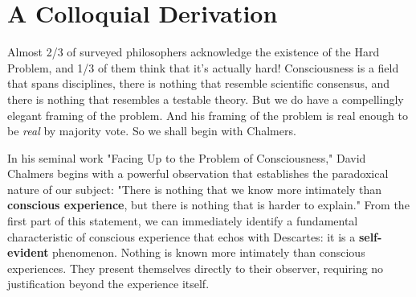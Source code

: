 \documentclass[runningheads]{llncs}
\begin{document}
\section{A Colloquial Derivation}

Almost 2/3 of surveyed philosophers acknowledge the existence of the Hard Problem, and 1/3 of them think that it's actually hard! \cite{BourgetChalmers2023} Consciousness is a field that spans disciplines, there is nothing that resemble scientific consensus, and there is nothing that resembles a testable theory. But we do have a compellingly elegant framing of the problem. And his framing of the problem is real enough to be \emph{real} by majority vote. So we shall begin with Chalmers.

In his seminal work "Facing Up to the Problem of Consciousness," David Chalmers begins with a powerful observation that establishes the paradoxical nature of our subject: "There is nothing that we know more intimately than \textbf{conscious experience}, but there is nothing that is harder to explain." From the first part of this statement, we can immediately identify a fundamental characteristic of conscious experience that echos with Descartes: it is a \textbf{self-evident} phenomenon. Nothing is known more intimately than conscious experiences. They present themselves directly to their observer, requiring no justification beyond the experience itself.
\end{document}
